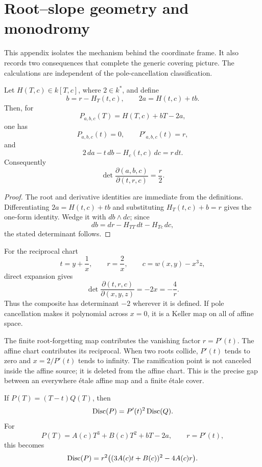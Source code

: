 \section{Root--slope geometry and monodromy}
\label{app:root-slope}

This appendix isolates the mechanism behind the coordinate frame.  It also
records two consequences that complete the generic covering picture.  The
calculations are independent of the pole-cancellation classification.

\begin{proposition}
\label{prop:root-slope-transform}
Let \(H(T,c)\in k[T,c]\), where \(2\in k^*\), and define
\[
b=r-H_T(t,c),\qquad
2a=H(t,c)+tb.
\]
Then, for
\[
P_{a,b,c}(T)=H(T,c)+bT-2a,
\]
one has
\[
P_{a,b,c}(t)=0,\qquad P'_{a,b,c}(t)=r,
\]
and
\[
2\,da-t\,db-H_c(t,c)\,dc=r\,dt.
\]
Consequently
\[
\det\frac{\partial(a,b,c)}{\partial(t,r,c)}=\frac r2.
\]
\end{proposition}

\begin{proof}
The root and derivative identities are immediate from the definitions.
Differentiating \(2a=H(t,c)+tb\) and substituting
\(H_T(t,c)+b=r\) gives the one-form identity.  Wedge it with
\(db\wedge dc\); since
\[
db=dr-H_{TT}\,dt-H_{Tc}\,dc,
\]
the stated determinant follows.
\end{proof}

For the reciprocal chart
\[
t=y+\frac1x,\qquad r=\frac2x,\qquad c=w(x,y)-x^3z,
\]
direct expansion gives
\[
\det\frac{\partial(t,r,c)}{\partial(x,y,z)}
=-2x=-\frac4r.
\]
Thus the composite has determinant \(-2\) wherever it is defined.  If pole
cancellation makes it polynomial across \(x=0\), it is a Keller map on all
of affine space.

\begin{remark}
The finite root-forgetting map contributes the vanishing factor
\(r=P'(t)\).  The affine chart contributes its reciprocal.  When two roots
collide, \(P'(t)\) tends to zero and \(x=2/P'(t)\) tends to infinity.  The
ramification point is not canceled inside the affine source; it is deleted
from the affine chart.  This is the precise gap between an everywhere
\'{e}tale affine map and a finite \'{e}tale cover.
\end{remark}

\begin{proposition}
\label{prop:marked-vandermonde}
If \(P(T)=(T-t)Q(T)\), then
\[
\operatorname{Disc}(P)=P'(t)^2\operatorname{Disc}(Q).
\]
For
\[
P(T)=A(c)T^3+B(c)T^2+bT-2a,\qquad r=P'(t),
\]
this becomes
\[
\operatorname{Disc}(P)
=r^2\bigl((3A(c)t+B(c))^2-4A(c)r\bigr).
\]
\end{proposition}

